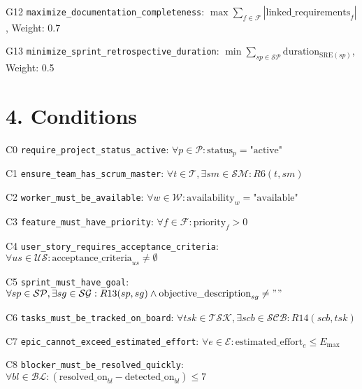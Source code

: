 \documentclass[12pt]{article}
\begin{document}
    \item[G12] \texttt{maximize\_documentation\_completeness}: 
      $ \max \sum_{f \in \mathcal{F}} |\text{linked\_requirements}_f| $, Weight: 0.7
    
    \item[G13] \texttt{minimize\_sprint\_retrospective\_duration}: 
      $ \min \sum_{sp \in \mathcal{SP}} \text{duration}_{\text{SRE}(sp)} $, Weight: 0.5

\section{4. Conditions}
\item[C0] \texttt{require\_project\_status\_active}: 
      $ \forall p \in \mathcal{P}: \text{status}_p = \text{"active"} $

    \item[C1] \texttt{ensure\_team\_has\_scrum\_master}: 
      $ \forall t \in \mathcal{T}, \exists sm \in \mathcal{SM}: R6(t, sm) $

    \item[C2] \texttt{worker\_must\_be\_available}: 
      $ \forall w \in \mathcal{W}: \text{availability}_w = \text{"available"} $

    \item[C3] \texttt{feature\_must\_have\_priority}: 
      $ \forall f \in \mathcal{F}: \text{priority}_f > 0 $

    \item[C4] \texttt{user\_story\_requires\_acceptance\_criteria}: 
      $ \forall us \in \mathcal{US}: \text{acceptance\_criteria}_{us} \neq \emptyset $

    \item[C5] \texttt{sprint\_must\_have\_goal}: 
      $ \forall sp \in \mathcal{SP}, \exists sg \in \mathcal{SG}: R13(sp, sg) \land \text{objective\_description}_{sg} \neq "" $

    \item[C6] \texttt{tasks\_must\_be\_tracked\_on\_board}: 
      $ \forall tsk \in \mathcal{TSK}, \exists scb \in \mathcal{SCB}: R14(scb, tsk) $

    \item[C7] \texttt{epic\_cannot\_exceed\_estimated\_effort}: 
      $ \forall e \in \mathcal{E}: \text{estimated\_effort}_e \leq E_{\max} $

    \item[C8] \texttt{blocker\_must\_be\_resolved\_quickly}: 
      $ \forall bl \in \mathcal{BL}: (\text{resolved\_on}_{bl} - \text{detected\_on}_{bl}) \leq 7 $
\end{document}
